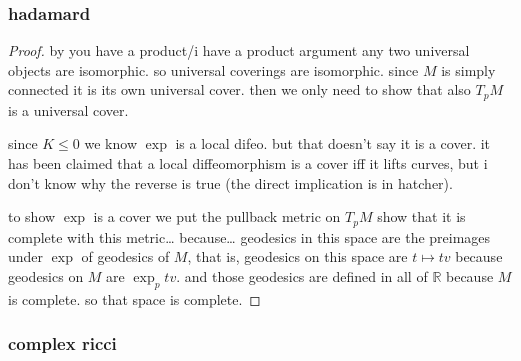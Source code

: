 \subsubsection{hadamard}
\begin{proof}\leavevmode
by you have a product/i have a product argument any two universal objects are isomorphic. so universal coverings are isomorphic. since \(M\) is simply connected it is its own universal cover. then we only need to show that also \(T_pM\) is a universal cover.

since \(K\leq 0\) we know \(\operatorname{exp}\) is a local difeo. but that doesn't say it is a cover. it has been claimed that a local diffeomorphism is a cover iff it lifts curves, but i don't know why the reverse is true (the direct implication is in hatcher).

to show \(\operatorname{exp}\) is a cover we put the pullback metric on \(T_pM\) show that it is complete with this metric… because… geodesics in this space are the preimages under \(\operatorname{exp}\) of geodesics of \(M\), that is, geodesics on this space are \(t \mapsto  tv\) because geodesics on \(M\) are \(\operatorname{exp}_ptv\). and those geodesics are defined in all of \(\mathbb{R}\) because \(M\) is complete. so that space is complete.

\end{proof}

\subsubsection{complex ricci}

